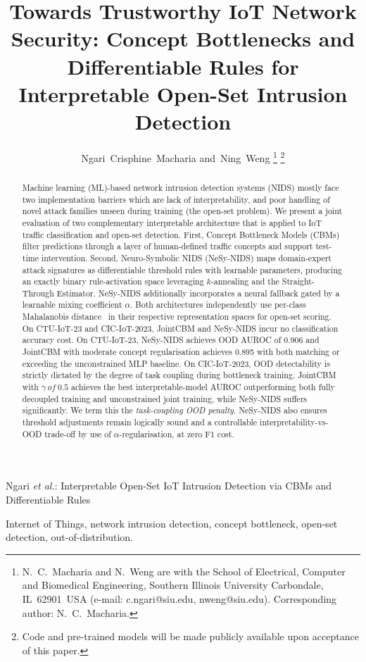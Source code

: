 \documentclass[journal]{IEEEtran}
\title{Towards Trustworthy IoT Network Security: Concept Bottlenecks
  and Differentiable Rules for Interpretable Open-Set Intrusion Detection}
\author{Ngari~Crisphine~Macharia and~Ning~Weng%
  \thanks{N.~C.~Macharia and N.~Weng are with the School of Electrical,
    Computer and Biomedical Engineering, Southern Illinois University
    Carbondale, IL~62901~USA
    (e-mail: c.ngari@siu.edu, nweng@siu.edu).
    Corresponding author: N.~C.~Macharia.}%
  \thanks{Code and pre-trained models will be made publicly available
    upon acceptance of this paper.}%
}
\begin{document}
%
{Ngari \MakeLowercase{\textit{et al.}}: Interpretable Open-Set IoT Intrusion Detection via CBMs and Differentiable Rules}

\maketitle

\begin{abstract}
Machine learning (ML)-based network intrusion detection systems (NIDS) mostly face two implementation barriers which are lack of interpretability, and poor handling of novel attack families unseen during training (the open-set problem). We present a joint evaluation of two complementary interpretable architecture that is applied to IoT traffic classification and
open-set detection. First, Concept Bottleneck Models (CBMs) filter predictions through a layer of human-defined traffic concepts and support test-time intervention. Second, Neuro-Symbolic NIDS (NeSy-NIDS) maps domain-expert attack signatures as differentiable threshold rules with learnable parameters, producing an exactly binary rule-activation space leveraging $k$-annealing and the Straight-Through Estimator. NeSy-NIDS additionally incorporates a neural fallback gated by a learnable mixing coefficient $\alpha$. Both architectures independently use per-class Mahalanobis distance~\cite{lee2018simple} in their respective representation spaces for open-set scoring. On CTU-IoT-23 and CIC-IoT-2023, JointCBM and NeSy-NIDS incur no classification accuracy cost. On CTU-IoT-23, NeSy-NIDS achieves OOD AUROC of 0.906 and JointCBM with moderate concept regularisation achieves 0.895 with both matching or exceeding the unconstrained MLP baseline. On CIC-IoT-2023, OOD detectability is strictly dictated by the degree of task coupling during bottleneck training. JointCBM with $\gamma~of~0.5$ achieves the best interpretable-model AUROC outperforming both fully decoupled training and unconstrained joint training, while NeSy-NIDS suffers significantly. We term
this the \emph{task-coupling OOD penalty}. NeSy-NIDS also ensures threshold adjustments remain logically sound and a controllable interpretability-vs-OOD trade-off by use of
$\alpha$-regularisation, at zero F1 cost.
\end{abstract}

\begin{IEEEkeywords}
Internet of Things, network intrusion detection, concept bottleneck, open-set detection, out-of-distribution.
\end{IEEEkeywords}
\end{document}
